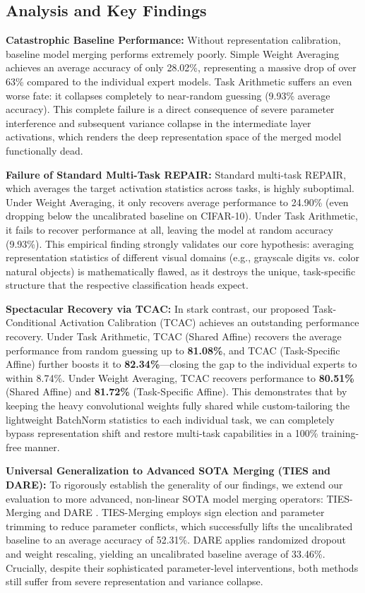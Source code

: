 \documentclass{article}
\theoremstyle{plain}
\theoremstyle{definition}
\theoremstyle{remark}
\begin{document}
\subsection{Analysis and Key Findings}

\textbf{Catastrophic Baseline Performance:}
Without representation calibration, baseline model merging performs extremely poorly. Simple Weight Averaging achieves an average accuracy of only 28.02\%, representing a massive drop of over 63\% compared to the individual expert models. Task Arithmetic suffers an even worse fate: it collapses completely to near-random guessing (9.93\% average accuracy). This complete failure is a direct consequence of severe parameter interference and subsequent variance collapse in the intermediate layer activations, which renders the deep representation space of the merged model functionally dead.

\textbf{Failure of Standard Multi-Task REPAIR:}
Standard multi-task REPAIR, which averages the target activation statistics across tasks, is highly suboptimal. Under Weight Averaging, it only recovers average performance to 24.90\% (even dropping below the uncalibrated baseline on CIFAR-10). Under Task Arithmetic, it fails to recover performance at all, leaving the model at random accuracy (9.93\%). This empirical finding strongly validates our core hypothesis: averaging representation statistics of different visual domains (e.g., grayscale digits vs. color natural objects) is mathematically flawed, as it destroys the unique, task-specific structure that the respective classification heads expect.

\textbf{Spectacular Recovery via TCAC:}
In stark contrast, our proposed Task-Conditional Activation Calibration (TCAC) achieves an outstanding performance recovery. Under Task Arithmetic, TCAC (Shared Affine) recovers the average performance from random guessing up to \textbf{81.08\%}, and TCAC (Task-Specific Affine) further boosts it to \textbf{82.34\%}—closing the gap to the individual experts to within 8.74\%. Under Weight Averaging, TCAC recovers performance to \textbf{80.51\%} (Shared Affine) and \textbf{81.72\%} (Task-Specific Affine). This demonstrates that by keeping the heavy convolutional weights fully shared while custom-tailoring the lightweight BatchNorm statistics to each individual task, we can completely bypass representation shift and restore multi-task capabilities in a 100\% training-free manner.

\textbf{Universal Generalization to Advanced SOTA Merging (TIES and DARE):}
To rigorously establish the generality of our findings, we extend our evaluation to more advanced, non-linear SOTA model merging operators: TIES-Merging \cite{yadav2023ties} and DARE \cite{yu2024dare}. 
TIES-Merging employs sign election and parameter trimming to reduce parameter conflicts, which successfully lifts the uncalibrated baseline to an average accuracy of 52.31\%. DARE applies randomized dropout and weight rescaling, yielding an uncalibrated baseline average of 33.46\%. 
Crucially, despite their sophisticated parameter-level interventions, both methods still suffer from severe representation and variance collapse. 
\end{document}
